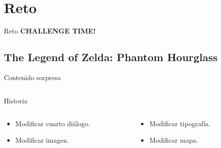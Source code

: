 \section{Reto}
\begin{frame}{Reto}
    \Huge\centering\textbf{CHALLENGE TIME!}
\end{frame}

\subsection{The Legend of Zelda: Phantom Hourglass}
\begin{frame}[t]{Contenido sorpresa}
    \begin{columns}
    \begin{column}[T]{0.5\textwidth}
        \centering
    \end{column}
    \hfill
    \begin{column}[T]{0.5\textwidth}
        \centering
    \end{column}
    \end{columns}
\end{frame}

\begin{frame}{Historia}
    \begin{columns}
    \begin{column}{0.5\textwidth}
        \begin{itemize}
            \item<1-> Modificar cuarto diálogo.
            \item<2-> Modificar imagen.
        \end{itemize}
        \vfill{}
        \hfill{}
    \end{column}
    \begin{column}{0.5\textwidth}
        \hfill{}
        \vfill{}
        \begin{itemize}
            \item<3-> Modificar tipografía.
            \item<4-> Modificar mapa.
        \end{itemize}
    \end{column}
    \end{columns}
\end{frame}

